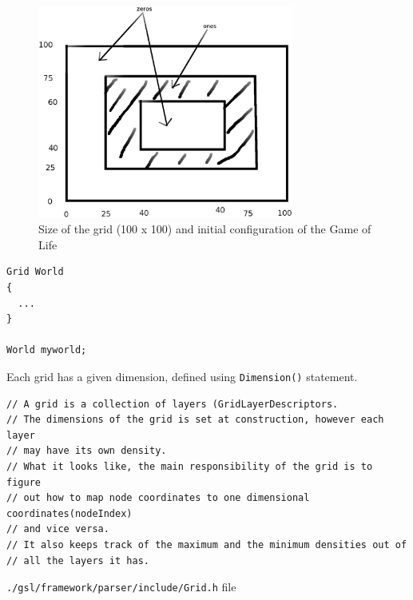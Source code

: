 \begin{figure}[hbt]
  \centerline{
  \includegraphics[height=7cm,
    angle=0]{./images/game-of-life-initial-configuration.eps}}
\caption{Size of the grid (100 x 100) and initial configuration of the Game of
Life} \label{fig:game-of-life-initial-configuration}
\end{figure}

\begin{verbatim}
Grid World
{
  ...
}

World myworld;
\end{verbatim}

Each grid has a given dimension, defined using \verb!Dimension()! statement.

{\small
\begin{verbatim}
// A grid is a collection of layers (GridLayerDescriptors.                                                                                   
// The dimensions of the grid is set at construction, however each layer                                                                     
// may have its own density.                                                                                                                 
// What it looks like, the main responsibility of the grid is to figure                                                                      
// out how to map node coordinates to one dimensional coordinates(nodeIndex)                                                                 
// and vice versa.                                                                                                                           
// It also keeps track of the maximum and the minimum densities out of                                                                       
// all the layers it has.                                        
\end{verbatim}
}
\verb!./gsl/framework/parser/include/Grid.h! file


